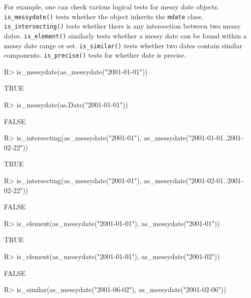 \documentclass[
]{jss}
\begin{document}
For example, one can check various logical tests for messy date objects.
\texttt{is\_messydate()} tests whether the object inherits the
\texttt{mdate} class. \texttt{is\_intersecting()} tests whether there is
any intersection between two messy dates. \texttt{is\_element()}
similarly tests whether a messy date can be found within a messy date
range or set. \texttt{is\_similar()} tests whether two dates contain
similar components. \texttt{is\_precise()} tests for whether date is
precise.

\begin{CodeChunk}
\begin{CodeInput}
R> is_messydate(as_messydate("2001-01-01"))
\end{CodeInput}
\begin{CodeOutput}
[1] TRUE
\end{CodeOutput}
\begin{CodeInput}
R> is_messydate(as.Date("2001-01-01"))
\end{CodeInput}
\begin{CodeOutput}
[1] FALSE
\end{CodeOutput}
\begin{CodeInput}
R> is_intersecting(as_messydate("2001-01"), as_messydate("2001-01-01..2001-02-22"))
\end{CodeInput}
\begin{CodeOutput}
[1] TRUE
\end{CodeOutput}
\begin{CodeInput}
R> is_intersecting(as_messydate("2001-01"), as_messydate("2001-02-01..2001-02-22"))
\end{CodeInput}
\begin{CodeOutput}
[1] FALSE
\end{CodeOutput}
\begin{CodeInput}
R> is_element(as_messydate("2001-01-01"), as_messydate("2001-01"))
\end{CodeInput}
\begin{CodeOutput}
[1] TRUE
\end{CodeOutput}
\begin{CodeInput}
R> is_element(as_messydate("2001-01-01"), as_messydate("2001-02"))
\end{CodeInput}
\begin{CodeOutput}
[1] FALSE
\end{CodeOutput}
\begin{CodeInput}
R> is_similar(as_messydate("2001-06-02"), as_messydate("2001-02-06"))
\end{CodeInput}
\begin{CodeOutput}

\end{CodeOutput}
\end{CodeChunk}
\end{document}
